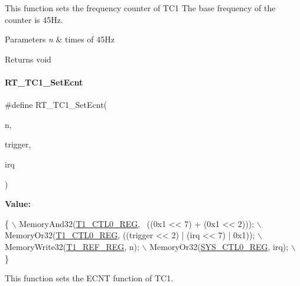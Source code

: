 This function sets the frequency counter of T\+C1 The base frequency of the counter is 45\+Hz. 


\begin{DoxyParams}{Parameters}
{\em n} & times of 45\+Hz \\
\hline
\end{DoxyParams}
\begin{DoxyReturn}{Returns}
void 
\end{DoxyReturn}
\mbox{\label{a00044_a4b786bd70b41c950892beeef4cbd2b27}} 
\paragraph{\texorpdfstring{R\+T\+\_\+\+T\+C1\+\_\+\+Set\+Ecnt}{RT\_TC1\_SetEcnt}}
{\footnotesize\ttfamily \#define R\+T\+\_\+\+T\+C1\+\_\+\+Set\+Ecnt(\begin{DoxyParamCaption}\item[{}]{n,  }\item[{}]{trigger,  }\item[{}]{irq }\end{DoxyParamCaption})}

{\bfseries Value\+:}
\begin{DoxyCode}
\{                                                                 \(\backslash\)
        MemoryAnd32(\mbox{\hyperlink{a00020_adadaa0ab1ebbd7ba9b70dfd24c3ed44da38632250c2e72df96fcaa3f8bd8ecc5e}{T1\_CTL0\_REG}}, ~((0x1 << 7) + (0x1 << 2)));         \(\backslash\)
        MemoryOr32(\mbox{\hyperlink{a00020_adadaa0ab1ebbd7ba9b70dfd24c3ed44da38632250c2e72df96fcaa3f8bd8ecc5e}{T1\_CTL0\_REG}}, ((trigger << 2) | (irq << 7) | 0x1)); \(\backslash\)
        MemoryWrite32(\mbox{\hyperlink{a00020_adadaa0ab1ebbd7ba9b70dfd24c3ed44dab7bb28fcf87a9c631bc17c016065c2da}{T1\_REF\_REG}}, n);                                 \(\backslash\)
        MemoryOr32(\mbox{\hyperlink{a00020_adadaa0ab1ebbd7ba9b70dfd24c3ed44dab61d9968d782d6c00e9de838e38913f5}{SYS\_CTL0\_REG}}, irq);                                \(\backslash\)
    \}
\end{DoxyCode}


This function sets the E\+C\+NT function of T\+C1. 


